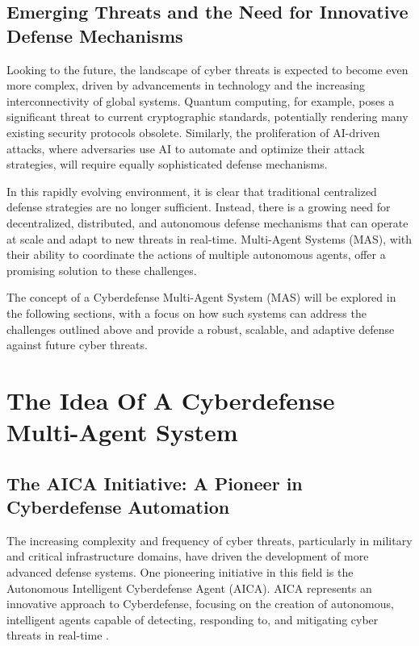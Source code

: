 \subsection{Emerging Threats and the Need for Innovative Defense Mechanisms}

Looking to the future, the landscape of cyber threats is expected to become even more complex, driven by advancements in technology and the increasing interconnectivity of global systems. Quantum computing, for example, poses a significant threat to current cryptographic standards, potentially rendering many existing security protocols obsolete\cite{mosca2018cybersecurity}\cite{bernstein2017post}. Similarly, the proliferation of AI-driven attacks, where adversaries use AI to automate and optimize their attack strategies, will require equally sophisticated defense mechanisms\cite{brundage2018malicious}.

In this rapidly evolving environment, it is clear that traditional centralized defense strategies are no longer sufficient. Instead, there is a growing need for decentralized, distributed, and autonomous defense mechanisms that can operate at scale and adapt to new threats in real-time\cite{moustafa2019holistic}. Multi-Agent Systems (MAS), with their ability to coordinate the actions of multiple autonomous agents, offer a promising solution to these challenges\cite{shakarian2015cyber}.

The concept of a Cyberdefense Multi-Agent System (MAS) will be explored in the following sections, with a focus on how such systems can address the challenges outlined above and provide a robust, scalable, and adaptive defense against future cyber threats\cite{kotenko2017cyber}.


\section{The Idea Of A Cyberdefense Multi-Agent System}

\subsection{The AICA Initiative: A Pioneer in Cyberdefense Automation}

The increasing complexity and frequency of cyber threats, particularly in military and critical infrastructure domains, have driven the development of more advanced defense systems. One pioneering initiative in this field is the Autonomous Intelligent Cyberdefense Agent (AICA). AICA represents an innovative approach to Cyberdefense, focusing on the creation of autonomous, intelligent agents capable of detecting, responding to, and mitigating cyber threats in real-time \cite{jajodia2017autonomous}.

